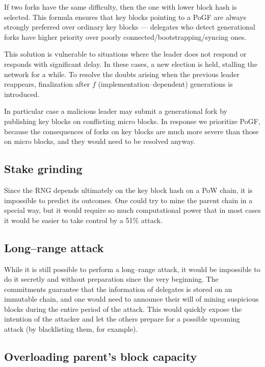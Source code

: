 If two forks have the same difficulty, then the one with lower block hash
is selected. This formula ensures that key blocks pointing to a PoGF are always
strongly preferred over ordinary key blocks — delegates who detect generational
forks have higher priority over poorly connected/bootstrapping/syncing ones.

This solution is vulnerable to situations where the leader does not respond
or responds with significant delay. In these cases, a new election is held,
stalling the network for a while. To resolve the doubts arising when the
previous leader reappears,
finalization after $f$ (implementation–dependent) generations is introduced.

In particular case a malicious leader may submit a generational
fork by publishing key blocks on conflicting micro blocks.
In response we prioritize PoGF, because the consequences of forks on
key blocks are much more severe than those on micro blocks, and they would need to
be resolved anyway.

\subsection{Stake grinding}

Since the RNG depends ultimately on the key block hash on a PoW chain, it is
impossible to predict its outcomes. One could try to mine the parent chain
in a special way, but it would require so much computational power that in
most cases it would be easier to take control by a 51\% attack.

\subsection{Long–range attack}
While it is still possible to perform a long–range attack, it would be impossible to do it
secretly and without preparation since the very beginning. The commitments
guarantee that the information of delegates is stored on an immutable chain,
and one would need to announce their will of mining suspicious blocks during
the entire period of the attack. This would quickly expose the intention of the attacker
and let the others prepare for a possible upcoming attack
(by blacklisting them, for example).

\subsection{Overloading parent's block capacity}

